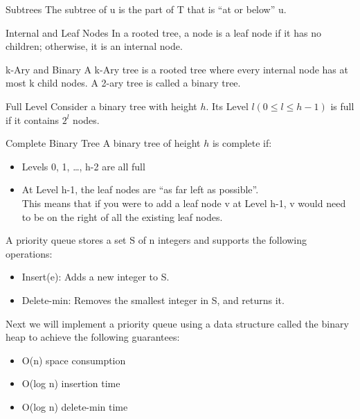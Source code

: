 \documentclass{lecture}
\begin{document}
\begin{landscape}
\begin{multicols}{2}
    \vfill
    \begin{note}{Subtrees}
        The subtree of u is the part of T that is ``at or below'' u.
    \end{note}
    \vfill
    \begin{note}{Internal and Leaf Nodes}
        In a rooted tree, a node is a leaf node if it has no children; otherwise, it is an internal node.
    \end{note}
    \vfill
    \begin{note}{k-Ary and Binary}
        A k-Ary tree is a rooted tree where every internal node has at most k child nodes. A 2-ary tree is called a binary tree.
    \end{note}
    \begin{note}{Full Level}
        Consider a binary tree with height $h$. Its Level $l (0\leq l \leq h-1)$ is full if it contains $2^l$ nodes.
    \end{note}
    \vfill
    \begin{note}{Complete Binary Tree}
        A binary tree of height $h$ is complete if:
        \begin{itemize}[nolistsep]
            \item Levels 0, 1, \ldots, h-2 are all full
            \item At Level h-1, the leaf nodes are ``as far left as possible''.\\
                This means that if you were to add a leaf node v at Level h-1, v would need to be on the right of all the existing leaf nodes.
        \end{itemize}
    \end{note}
    \vfill

    \begin{note}{}
        A priority queue stores a set S of n integers and supports the following operations:
        \begin{itemize}[nolistsep]
            \item Insert(e): Adds a new integer to S.
            \item Delete-min: Removes the smallest integer in S, and returns it.
        \end{itemize}
    \end{note}
    \vfill
    \begin{note}{}
        Next we will implement a priority queue using a data structure called the binary heap to achieve the following guarantees:
        \begin{itemize}[nolistsep]
            \item O(n) space consumption
            \item O(log n) insertion time
            \item O(log n) delete-min time
        \end{itemize}
    \end{note}
    \vfill


\end{multicols}
\end{landscape}
\end{document}
